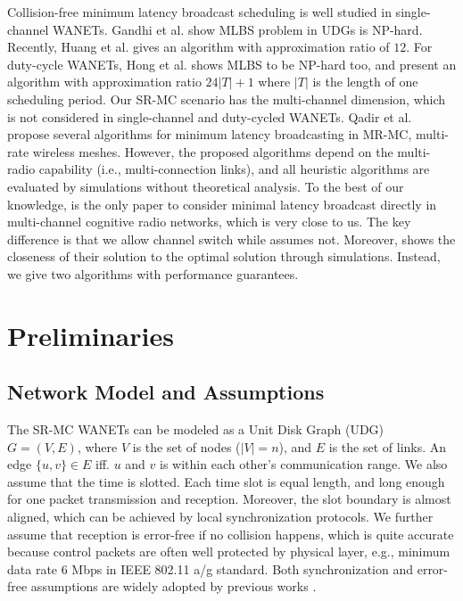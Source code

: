 \documentclass[10pt, conference]{IEEEtran}
\begin{document}
Collision-free minimum latency broadcast scheduling is well
studied in single-channel WANETs. Gandhi et al. \cite{UDG} show
MLBS problem in UDGs is NP-hard. Recently, Huang et al.
\cite{info09} gives an algorithm with approximation ratio of
$12$. For duty-cycle WANETs, Hong et al. \cite{ICC09} shows
MLBS to be NP-hard too, and present an algorithm with
approximation ratio $24|T|+1$ where $|T|$ is the length of one
scheduling period. Our SR-MC scenario has the multi-channel
dimension, which is not considered in single-channel and
duty-cycled WANETs. Qadir et al. \cite{MR-MC} propose several
algorithms for minimum latency broadcasting in MR-MC,
multi-rate wireless meshes. However, the proposed algorithms
depend on the multi-radio capability (i.e., multi-connection
links), and all heuristic algorithms are evaluated by
simulations without theoretical analysis. To the best of our
knowledge, \cite{ICDCN10} is the only paper to consider minimal
latency broadcast directly in multi-channel cognitive radio
networks, which is very close to us. The key difference is that
we allow channel switch while \cite{ICDCN10} assumes not.
Moreover, \cite{ICDCN10} shows the closeness of their solution
to the optimal solution through simulations. Instead, we give
two algorithms with performance guarantees.



\section{Preliminaries} \label{pre}
\subsection{Network Model and Assumptions}
The SR-MC WANETs can be modeled as a Unit Disk Graph (UDG) $G =
(V, E)$, where $V$ is the set of nodes ($|V|=n$), and $E$ is
the set of links. An edge $\{u, v\} \in E$ iff. $u$ and $v$ is
within each other's communication range. We also assume that
the time is slotted. Each time slot is equal length, and long
enough for one packet transmission and reception. Moreover, the
slot boundary is almost aligned, which can be achieved by local
synchronization protocols. We further assume that reception is
error-free if no collision happens, which is quite accurate
because control packets are often well protected by physical
layer, e.g., minimum data rate 6 Mbps in IEEE 802.11 a/g
standard. Both synchronization and error-free assumptions are
widely adopted by previous works \cite{info09, info07, ICDCN10,
MR-MC, UDG}.
\end{document}
